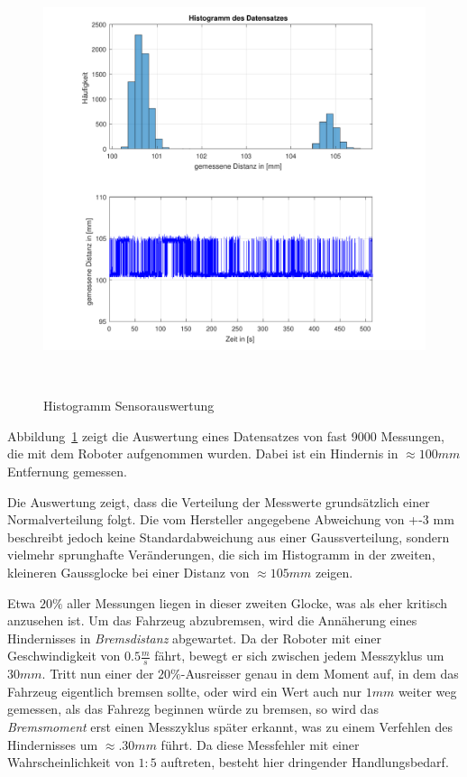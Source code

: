 \documentclass[main.tex]{subfiles} %
\begin{document}
\begin{figure}[H]
    \centering
    \includegraphics[width=0.75\linewidth]{./fig_Parametrierung_HcSr04/Messverteilung_HcSr04.pdf}
    \caption{Histogramm Sensorauswertung}~\label{fig:HistogrammHcSr04}
\end{figure}

Abbildung~\ref{fig:HistogrammHcSr04} zeigt die Auswertung eines Datensatzes von
fast 9000 Messungen, die mit dem Roboter aufgenommen wurden. Dabei ist ein
Hindernis in $\approx 100mm$ Entfernung gemessen.

Die Auswertung zeigt, dass die Verteilung der Messwerte grundsätzlich einer
Normalverteilung folgt. Die vom Hersteller angegebene Abweichung von +-3 mm
beschreibt jedoch keine Standardabweichung aus einer Gaussverteilung, sondern
vielmehr sprunghafte Veränderungen, die sich im Histogramm in der zweiten,
kleineren Gaussglocke bei einer Distanz von $\approx 105mm$ zeigen.

Etwa $20 \%$ aller Messungen liegen in dieser zweiten Glocke, was als eher
kritisch anzusehen ist. Um das Fahrzeug abzubremsen, wird die Annäherung eines
Hindernisses in \textit{Bremsdistanz} abgewartet. Da der Roboter mit einer
Geschwindigkeit von $0.5 \frac{m}{s}$ fährt, bewegt er sich zwischen jedem
Messzyklus um $30 mm$. Tritt nun einer der $20\%$-Ausreisser genau in dem
Moment auf, in dem das Fahrzeug eigentlich bremsen sollte, oder wird ein Wert
auch nur $1mm$ weiter weg gemessen, als das Fahrezg beginnen würde zu bremsen,
so wird das \textit{Bremsmoment} erst einen Messzyklus später erkannt, was zu
einem Verfehlen des Hindernisses um $\approx. 30 mm$ führt. Da diese Messfehler
mit einer Wahrscheinlichkeit von $1:5$ auftreten, besteht hier dringender
Handlungsbedarf.
\end{document}
